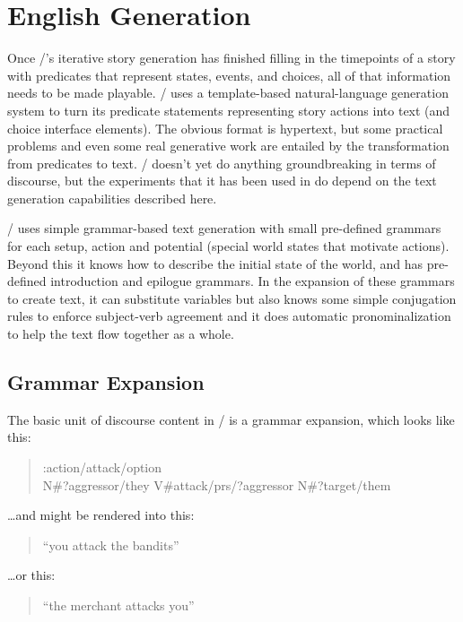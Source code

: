 \chapter{English Generation}
\label{ap:nlg}%

Once \dunyazad/'s iterative story generation has finished filling in the timepoints of a story with predicates that represent states, events, and choices, all of that information needs to be made playable.
%
\dunyazad/ uses a template-based natural-language generation system to turn its predicate statements representing story actions into text (and choice interface elements).
%
The obvious format is hypertext, but some practical problems and even some real generative work are entailed by the transformation from predicates to text.
%
\dunyazad/ doesn't yet do anything groundbreaking in terms of discourse, but the experiments that it has been used in do depend on the text generation capabilities described here.


\dunyazad/ uses simple grammar-based text generation with small pre-defined grammars for each setup, action and potential (special world states that motivate actions).
%
Beyond this it knows how to describe the initial state of the world, and has pre-defined introduction and epilogue grammars.
%
In the expansion of these grammars to create text, it can substitute variables but also knows some simple conjugation rules to enforce subject-verb agreement and it does automatic pronominalization to help the text flow together as a whole.

\section{Grammar Expansion}

The basic unit of discourse content in \dunyazad/ is a grammar expansion, which looks like this:
\begin{quote}
\ttfamily
:action/attack/option \\
N\#?aggressor/they V\#attack/prs/?aggressor N\#?target/them
\end{quote}

\noindent \ldots and might be rendered into this:

\begin{quote}
``you attack the bandits''
\end{quote}

\noindent \ldots or this:

\begin{quote}
``the merchant attacks you''
\end{quote}

